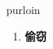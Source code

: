 
\begin{frame}
{\huge purloin}
\begin{center}
\begin{enumerate}\Large
  \item \textbf{偷窃}
\end{enumerate}
\end{center}
\end{frame}
